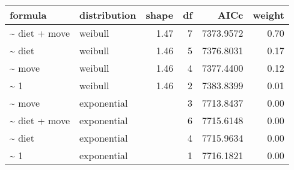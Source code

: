 \begin{table}[ht]
\centering
\begin{tabular}{llrrrr}
 formula & distribution & shape & df & AICc & weight \\ 
  \hline
\~{} diet + move & weibull & 1.47 & 7 & 7373.9572 & 0.70 \\ 
  \~{} diet & weibull & 1.46 & 5 & 7376.8031 & 0.17 \\ 
  \~{} move & weibull & 1.46 & 4 & 7377.4400 & 0.12 \\ 
  \~{} 1 & weibull & 1.46 & 2 & 7383.8399 & 0.01 \\ 
  \~{} move & exponential &  & 3 & 7713.8437 & 0.00 \\ 
  \~{} diet + move & exponential &  & 6 & 7715.6148 & 0.00 \\ 
  \~{} diet & exponential &  & 4 & 7715.9634 & 0.00 \\ 
  \~{} 1 & exponential &  & 1 & 7716.1821 & 0.00 \\ 
  \end{tabular}
\label{tab:er}
\end{table}

